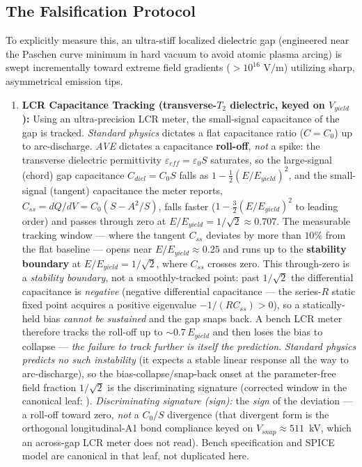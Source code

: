 \subsection{The Falsification Protocol}
To explicitly measure this, an ultra-stiff localized dielectric gap (engineered near the Paschen curve minimum in hard vacuum to avoid atomic plasma arcing) is swept incrementally toward extreme field gradients ($> 10^{16} \text{ V/m}$) utilizing sharp, asymmetrical emission tips.
\begin{enumerate}
    \item \textbf{LCR Capacitance Tracking (transverse-$T_2$ dielectric, keyed on $V_{yield}$):} Using an ultra-precision LCR meter, the small-signal capacitance of the gap is tracked. \emph{Standard physics} dictates a flat capacitance ratio ($C=C_0$) up to arc-discharge. \emph{AVE} dictates a capacitance \textbf{roll-off}, \emph{not} a spike: the transverse dielectric permittivity $\varepsilon_{eff}=\varepsilon_0 S$ saturates, so the large-signal (chord) gap capacitance $C_{diel}=C_0 S$ falls as $1-\tfrac12(E/E_{yield})^2$, and the small-signal (tangent) capacitance the meter reports, $C_{ss}=dQ/dV=C_0(S-A^2/S)$, falls faster ($1-\tfrac32(E/E_{yield})^2$ to leading order) and passes through zero at $E/E_{yield}=1/\sqrt2\approx0.707$. The measurable tracking window --- where the tangent $C_{ss}$ deviates by more than $10\%$ from the flat baseline --- opens near $E/E_{yield}\approx0.25$ and runs up to the \textbf{stability boundary} at $E/E_{yield}=1/\sqrt2$, where $C_{ss}$ crosses zero. This through-zero is a \emph{stability boundary}, not a smoothly-tracked point: past $1/\sqrt2$ the differential capacitance is \emph{negative} (negative differential capacitance --- the series-$R$ static fixed point acquires a positive eigenvalue $-1/(RC_{ss})>0$), so a statically-held bias \emph{cannot be sustained} and the gap snaps back. A bench LCR meter therefore tracks the roll-off up to $\sim0.7\,E_{yield}$ and then loses the bias to collapse --- \emph{the failure to track further is itself the prediction}. \emph{Standard physics predicts no such instability} (it expects a stable linear response all the way to arc-discharge), so the bias-collapse/snap-back onset at the parameter-free field fraction $1/\sqrt2$ is the discriminating signature (corrected window in the canonical leaf: ). \emph{Discriminating signature (sign):} the \emph{sign} of the deviation --- a roll-off toward zero, \emph{not} a $C_0/S$ divergence (that divergent form is the orthogonal longitudinal-A1 bond compliance keyed on $V_{snap}\approx511$~kV, which an across-gap LCR meter does not read). Bench specification and SPICE model are canonical in that leaf, not duplicated here.

\end{enumerate}
